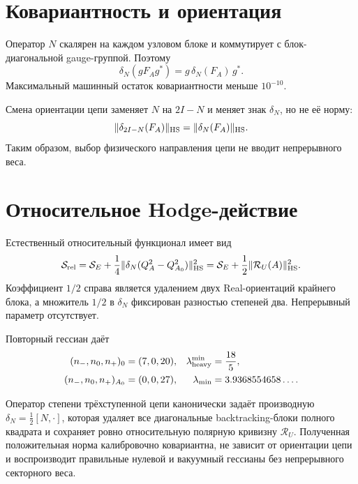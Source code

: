 \section{Ковариантность и ориентация}

Оператор $N$ скалярен на каждом узловом блоке и коммутирует с
блок-диагональной gauge-группой. Поэтому
\begin{equation}
 \delta_N(gF_Ag^*)=g\,\delta_N(F_A)\,g^*.
 \label{eq:v7-degree-two-covariance}
\end{equation}
Максимальный машинный остаток ковариантности меньше $10^{-10}$.

Смена ориентации цепи заменяет $N$ на $2I-N$ и меняет знак
$\delta_N$, но не её норму:
\begin{equation}
 \|\delta_{2I-N}(F_A)\|_{\rm HS}
 =\|\delta_N(F_A)\|_{\rm HS}.
 \label{eq:v7-degree-two-orientation-independence}
\end{equation}
Таким образом, выбор физического направления цепи не вводит непрерывного
веса.

\section{Относительное Hodge-действие}

Естественный относительный функционал имеет вид
\begin{equation}
 \mathcal S_{\rm rel}
 =\mathcal S_E+\frac14
 \|\delta_N(Q_A^2-Q_{A_0}^2)\|_{\rm HS}^2
 =\mathcal S_E+\frac12\|\mathcal R_U(A)\|_{\rm HS}^2.
 \label{eq:v7-degree-two-relative-action}
\end{equation}
Коэффициент $1/2$ справа является удалением двух Real-ориентаций крайнего
блока, а множитель $1/2$ в $\delta_N$ фиксирован разностью степеней два.
Непрерывный параметр отсутствует.

Повторный гессиан даёт
\begin{align}
 (n_-,n_0,n_+)_{0}&=(7,0,20),
 &\lambda_{\rm heavy}^{\min}&=\frac{18}{5},
 \label{eq:v7-degree-two-origin-signature}\\
 (n_-,n_0,n_+)_{A_0}&=(0,0,27),
 &\lambda_{\min}&=3.9368554658\ldots.
 \label{eq:v7-degree-two-vacuum-signature}
\end{align}

\begin{theorem}
Оператор степени трёхступенной цепи канонически задаёт производную
$\delta_N=\frac12[N,\cdot]$, которая удаляет все диагональные
backtracking-блоки полного квадрата и сохраняет ровно относительную
полярную кривизну $\mathcal R_U$. Полученная положительная норма
калибровочно ковариантна, не зависит от ориентации цепи и воспроизводит
правильные нулевой и вакуумный гессианы без непрерывного секторного веса.
\end{theorem}

